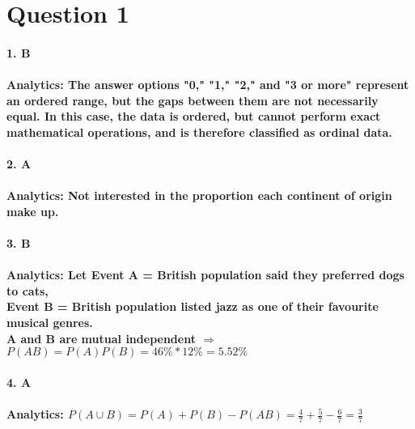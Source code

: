 \section{Question 1}
\paragraph{1. B}
\paragraph{\textbf{Analytics:}  The answer options "0," "1," "2," and "3 or more" represent an ordered range, but the gaps between them are not necessarily equal. In this case, the data is ordered, but cannot perform exact mathematical operations, and is therefore classified as ordinal data.}
\paragraph{2. A}
\paragraph{\textbf{Analytics:} Not interested in the proportion each continent of origin make up.}
% 
\paragraph{3. B}
\paragraph{\textbf{Analytics:} Let Event A = British population said they preferred dogs to cats, \\ Event B = British population
    listed jazz as one of their favourite musical genres. \\
    A and B are mutual independent $\Rightarrow$ $P(AB)=P(A)P(B)=46\%*12\%=5.52\%$ }
\paragraph{4. A}
\paragraph{{\textbf{Analytics:} $P(A \cup B)=P(A)+P(B)-P(AB)=\frac{4}{7}+\frac{5}{7}-\frac{6}{7}=\frac{3}{7}$}}
